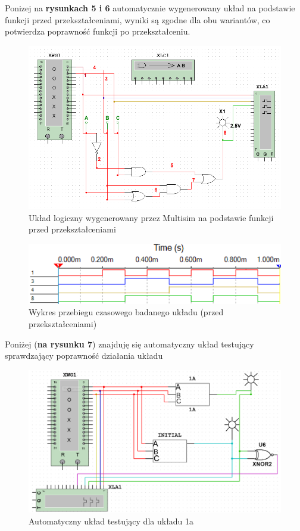 \documentclass{article}
\begin{document}
Ponizej na \textbf{rysunkach 5 i 6} automatycznie wygenerowany układ na podstawie funkcji przed przekształceniami, wyniki są zgodne dla obu wariantów,
co potwierdza poprawność funkcji po przekształceniu.

\begin{figure}[H]
    \centering
    \includegraphics[width=\textwidth]{uklad_1_wyg.png}
    \caption{Układ logiczny wygenerowany przez Multisim na podstawie funkcji przed przekształceniami}
\end{figure}

\begin{figure}[H]
    \centering
    \includegraphics[width=\textwidth]{analiza_1_wyg.png}
    \caption{Wykres przebiegu czasowego badanego układu (przed przekształceniami)}
\end{figure}

Poniżej (\textbf{na rysunku 7}) znajduję się automatyczny układ testujący sprawdzający poprawność działania układu

\begin{figure}[H]
    \centering
    \includegraphics[width=\textwidth]{test_1.png}
    \caption{Automatyczny układ testujący dla układu 1a}
\end{figure}
\end{document}
